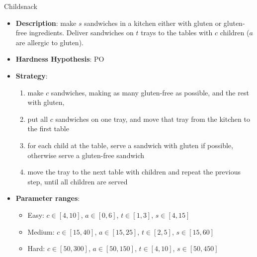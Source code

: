 \documentclass[aspectratio=169,xcolor=dvipsnames]{beamer}
\begin{document}
\begin{frame}{Childsnack}

    \begin{itemize}
        \item \textbf{Description}: make $s$ sandwiches in a kitchen either with gluten or gluten-free ingredients. Deliver sandwiches on $t$ trays to the tables with $c$ children ($a$ are allergic to gluten).
        \item \textbf{Hardness Hypothesis}: PO %
        \item \textbf{Strategy}:
        \begin{enumerate}
            \item make $c$ sandwiches, making as many gluten-free as possible, and the rest with gluten,
            \item put all $c$ sandwiches on one tray, and move that tray from the kitchen to the first table
            \item for each child at the table, serve a sandwich with gluten if possible, otherwise serve a gluten-free sandwich
            \item move the tray to the next table with children and repeat the previous step, until all children are served
        \end{enumerate}
        \item \textbf{Parameter ranges}:
        \begin{itemize}
            \item Easy: $c\in[4, 10]$, $a\in[0, 6]$, $t\in[1, 3]$, $s\in[4, 15]$
            \item Medium: $c\in[15, 40]$, $a\in[15, 25]$, $t\in[2, 5]$, $s\in[15, 60]$
            \item Hard: $c\in[50, 300]$, $a\in[50, 150]$, $t\in[4, 10]$, $s\in[50, 450]$
        \end{itemize}
    \end{itemize}

\end{frame}
\end{document}
